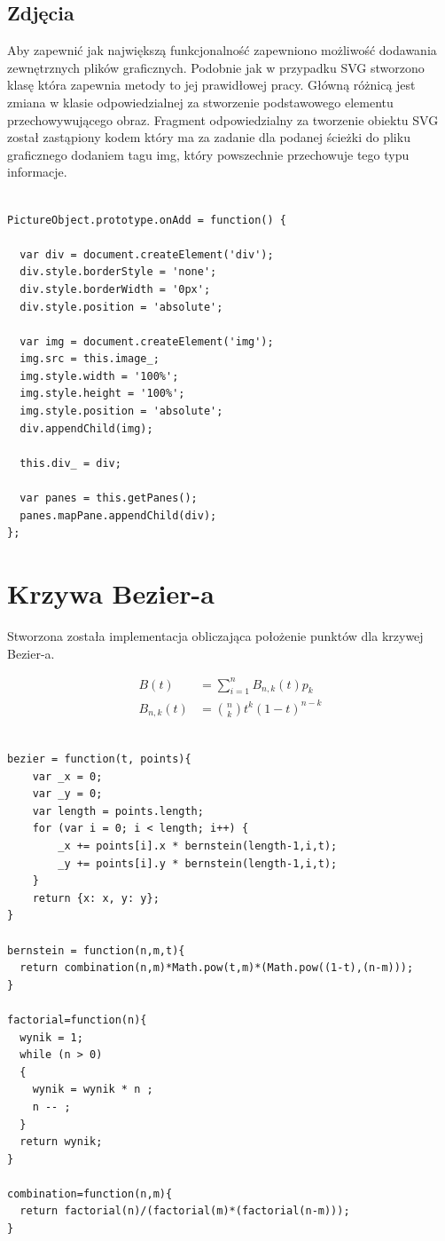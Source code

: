 \subsection{Zdjęcia}
\label{subsec:pictures}

Aby zapewnić jak największą funkcjonalność zapewniono możliwość dodawania zewnętrznych plików graficznych.
Podobnie jak w przypadku SVG stworzono klasę która zapewnia metody to jej prawidłowej pracy. Główną różnicą jest zmiana w klasie odpowiedzialnej za stworzenie podstawowego elementu przechowywującego obraz. Fragment odpowiedzialny za tworzenie obiektu SVG został zastąpiony kodem który ma za zadanie dla podanej ścieżki do pliku graficznego dodaniem tagu img, który powszechnie przechowuje tego typu informacje.

\lstset{language=JavaScript}
\begin{lstlisting}[label={lst:svgImpl},caption={Klasa do obsługi SVG}]

PictureObject.prototype.onAdd = function() {

  var div = document.createElement('div');
  div.style.borderStyle = 'none';
  div.style.borderWidth = '0px';
  div.style.position = 'absolute';

  var img = document.createElement('img');
  img.src = this.image_;
  img.style.width = '100%';
  img.style.height = '100%';
  img.style.position = 'absolute';
  div.appendChild(img);

  this.div_ = div;

  var panes = this.getPanes();
  panes.mapPane.appendChild(div);
};

\end{lstlisting}


\section{Krzywa Bezier-a}
\label{sec:bezierimpl}

Stworzona została implementacja obliczająca położenie punktów dla krzywej Bezier-a.

\begin{eqnarray}
B(t) &= \sum\limits_{i=1}^n B_{n,k} (t) p_{k} \\
B_{n,k}(t) &=\binom{n}{k} t^k(1-t)^{n-k}
\end{eqnarray}


\lstset{language=JavaScript}
\begin{lstlisting}[label={lst:aproks},caption={Aproksymacja danych}]

bezier = function(t, points){
	var _x = 0;
	var _y = 0;
	var length = points.length;
	for (var i = 0; i < length; i++) {
		_x += points[i].x * bernstein(length-1,i,t);
		_y += points[i].y * bernstein(length-1,i,t);
	}
	return {x: x, y: y};
}

bernstein = function(n,m,t){
  return combination(n,m)*Math.pow(t,m)*(Math.pow((1-t),(n-m)));
}

factorial=function(n){
  wynik = 1;
  while (n > 0)
  {
    wynik = wynik * n ;
    n -- ;
  }
  return wynik;
}

combination=function(n,m){
  return factorial(n)/(factorial(m)*(factorial(n-m)));
}

\end{lstlisting}
